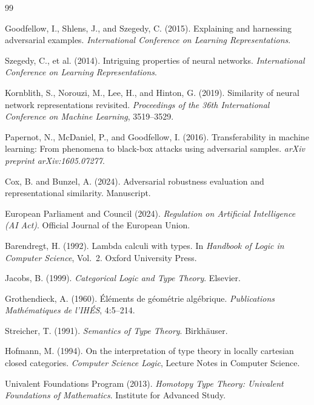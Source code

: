 \documentclass[12pt,a4paper]{article}
\theoremstyle{plain}
\theoremstyle{definition}
\begin{document}
\begin{thebibliography}{99}

 Goodfellow, I., Shlens, J., and Szegedy, C. (2015). Explaining and harnessing adversarial examples. \textit{International Conference on Learning Representations}.

 Szegedy, C., et al. (2014). Intriguing properties of neural networks. \textit{International Conference on Learning Representations}.

 Kornblith, S., Norouzi, M., Lee, H., and Hinton, G. (2019). Similarity of neural network representations revisited. \textit{Proceedings of the 36th International Conference on Machine Learning}, 3519--3529.

 Papernot, N., McDaniel, P., and Goodfellow, I. (2016). Transferability in machine learning: From phenomena to black-box attacks using adversarial samples. \textit{arXiv preprint arXiv:1605.07277}.

 Cox, B. and Bunzel, A. (2024). Adversarial robustness evaluation and representational similarity. Manuscript.

 European Parliament and Council (2024). \textit{Regulation on Artificial Intelligence (AI Act)}. Official Journal of the European Union.

 Barendregt, H. (1992). Lambda calculi with types. In \textit{Handbook of Logic in Computer Science}, Vol.~2. Oxford University Press.

 Jacobs, B. (1999). \textit{Categorical Logic and Type Theory}. Elsevier.

 Grothendieck, A. (1960). \'{E}l\'{e}ments de g\'{e}om\'{e}trie alg\'{e}brique. \textit{Publications Math\'{e}matiques de l'IH\'{E}S}, 4:5--214.

 Streicher, T. (1991). \textit{Semantics of Type Theory}. Birkh\"auser.

 Hofmann, M. (1994). On the interpretation of type theory in locally cartesian closed categories. \textit{Computer Science Logic}, Lecture Notes in Computer Science.

 Univalent Foundations Program (2013). \textit{Homotopy Type Theory: Univalent Foundations of Mathematics}. Institute for Advanced Study.


\end{thebibliography}
\end{document}
